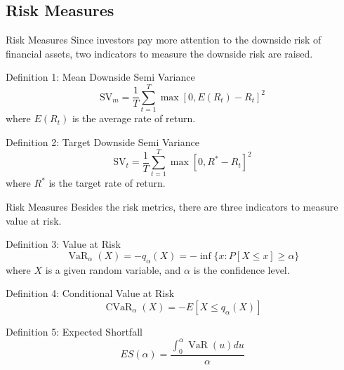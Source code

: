 \documentclass{beamer}
\begin{document}
\subsection{Risk Measures}
\begin{frame}{Risk Measures}
Since investors pay more attention to the downside risk of financial assets, two indicators to measure the downside risk are raised.
\begin{block}{Definition 1: Mean Downside Semi Variance}
\begin{equation*}
    \text{SV}_{m} = \frac{1}{T} \sum_{t=1}^T \max \left[0, E(R_{t})-R_{t}\right]^2    
\end{equation*}
    where $E(R_{t})$ is the average rate of return.
\end{block}
\begin{block}{Definition 2: Target Downside Semi Variance}
\begin{equation*}
    \text{SV}_{t} =\frac{1}{T} \sum_{t=1}^T \max \left[0, R^*-R_t\right]^2    
\end{equation*}
    where $R^*$ is the target rate of return.
\end{block}
\end{frame}

\begin{frame}{Risk Measures}
Besides the risk metrics, there are three indicators to measure value at risk.
\begin{block}{Definition 3: Value at Risk}
\begin{equation*}
\operatorname{VaR}_\alpha(X)=-q_\alpha(X)=-\inf \{x: P[X \leq x] \geq \alpha\}     
\end{equation*}
where $X$ is a given random variable, and $\alpha$ is the confidence level.
\end{block}

\begin{block}{Definition 4: Conditional Value at Risk}
\begin{equation*}
\operatorname{CVaR}_\alpha(X)=-E\left[X \leq q_\alpha(X)\right]       
\end{equation*}
\end{block}

\begin{block}{Definition 5: Expected Shortfall}
\begin{equation*}
 ES(\alpha)=\frac{\int_0^\alpha \operatorname{VaR}(u) du}{\alpha}      
\end{equation*}
\end{block}

\end{frame}
\end{document}
